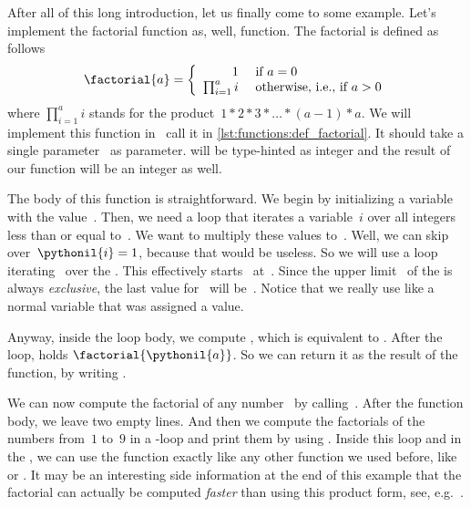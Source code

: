 %
%
%
After all of this long introduction, let us finally come to some example.
Let's implement the factorial function as, well, function.
The factorial is defined as follows~\cite{D1991TEHOTFF,CB2022FBDOTFF}%
%
\begin{equation}%
\factorial{a}=\left\{\begin{array}{rl}%
1&\textnormal{~if~}a = 0\\%
\prod_{i=1}^a i&\textnormal{~otherwise, i.e., if~}a>0%
\end{array}\right.%
\label{eq:factorial}%
\end{equation}%
%
where $\prod_{i=1}^a i$ stands for the product~$1*2*3*\dots*(a-1)*a$.
We will implement this function in \python\ call it  in \cref{lst:functions:def_factorial}.
It should take a single parameter~ as parameter.
 will be type-hinted as integer and the result of our function will be an integer as well.

The body of this function is straightforward.
We begin by initializing a variable  with the value~.
Then, we need a loop that iterates a variable~$i$ over all integers less than or equal to~.
We want to multiply these values to~.
Well, we can skip over~$\pythonil{i}=1$, because that would be useless.
So we will use a  loop iterating~ over the .
This effectively starts~ at~.
Since the upper limit~ of the  is always \emph{exclusive}, the last value for~ will be~.
Notice that we really use  like a normal variable that was assigned a value.%
%
\begin{sloppypar}%
Anyway, inside the loop body, we compute \pythonIdx{*=}, which is equivalent to .
After the loop,  holds $\factorial{\pythonil{a}}$.
So we can return it as the result of the function, by writing .%
\end{sloppypar}%
%
We can now compute the factorial of any number~ by calling~.
After the function body, we leave two empty lines.
And then we compute the factorials of the numbers from~$1$ to~$9$ in a -loop and print them by using .
Inside this loop and in the , we can use the function  exactly like any other function we used before, like  or .
It may be an interesting side information at the end of this example that the factorial can actually be computed \emph{faster} than using this product form, see, e.g.~\cite{L2015ANKOFF}.

